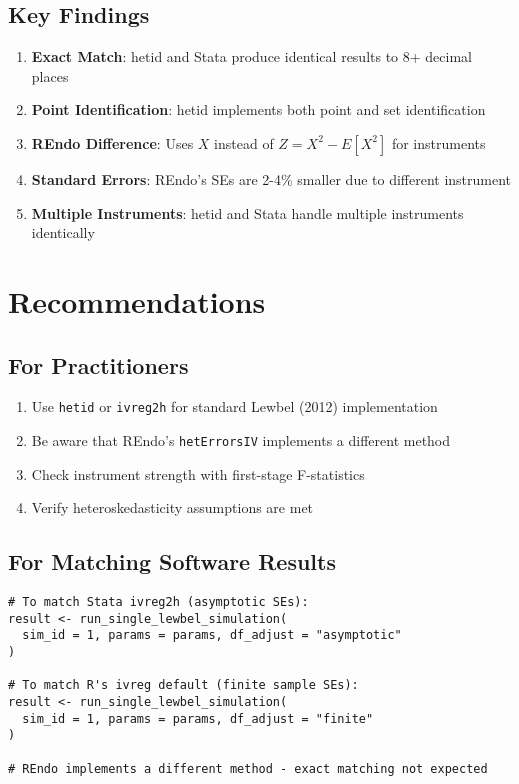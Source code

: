 \documentclass[12pt]{article}
\begin{document}
\subsection{Key Findings}

\begin{enumerate}
\item \textbf{Exact Match}: hetid and Stata produce identical results to 8+ decimal places
\item \textbf{Point Identification}: hetid implements both point and set identification
\item \textbf{REndo Difference}: Uses $X$ instead of $Z = X^2 - E[X^2]$ for instruments
\item \textbf{Standard Errors}: REndo's SEs are 2-4\% smaller due to different instrument
\item \textbf{Multiple Instruments}: hetid and Stata handle multiple instruments identically
\end{enumerate}

\section{Recommendations}

\subsection{For Practitioners}

\begin{enumerate}
\item Use \texttt{hetid} or \texttt{ivreg2h} for standard Lewbel (2012) implementation
\item Be aware that REndo's \texttt{hetErrorsIV} implements a different method
\item Check instrument strength with first-stage F-statistics
\item Verify heteroskedasticity assumptions are met
\end{enumerate}

\subsection{For Matching Software Results}

\begin{lstlisting}[caption={Matching different implementations}]
# To match Stata ivreg2h (asymptotic SEs):
result <- run_single_lewbel_simulation(
  sim_id = 1, params = params, df_adjust = "asymptotic"
)

# To match R's ivreg default (finite sample SEs):
result <- run_single_lewbel_simulation(
  sim_id = 1, params = params, df_adjust = "finite"
)

# REndo implements a different method - exact matching not expected
\end{lstlisting}
\end{document}
